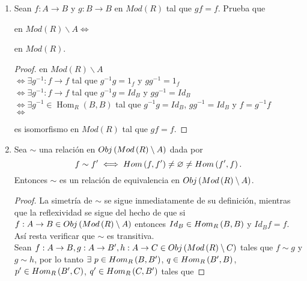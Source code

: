 \documentclass{article}
\begin{document}
\begin{enumerate}[label=\textbf{Ej \arabic*.}]
		\item Sean $f\colon A\longrightarrow B$ y $g\colon B\longrightarrow B$ en $Mod(R)$ tal que $gf=f$. Prueba que\\
		
		en $Mod(R)\backslash A$\quad $\iff$ \quad 
		en $Mod(R)$.
		
		\begin{proof}
			en $Mod(R)\backslash A$\\
			$\iff \exists g^{-1}\colon f\longrightarrow f$ tal que $g^{-1}g=1_f$ y $gg^{-1}=1_f$\\
			$\iff \exists g^{-1}\colon f\longrightarrow f$ tal que $g^{-1}g=Id_B$ y $gg^{-1}=Id_B$\\
			$\iff \exists g^{-1}\in \operatorname{Hom}_R(B,B)$ tal que $g^{-1}g=Id_B$, $gg^{-1}=Id_B$ y $f=g^{-1}f$\\
			$\iff$ 
			es isomorfismo en $Mod(R)$ tal que $gf=f$.
		\end{proof}
		\item Sea $\sim$ una relación en $Obj\left(Mod\left(R\right)\setminus A\right)$ dada por
		\begin{equation*}
			f\sim f'\iff Hom\left(f,f'\right)\neq\varnothing\neq Hom\left(f',f\right).
		\end{equation*}
		Entonces $\sim$ es un relación de equivalencia en $Obj\left(Mod\left(R\right)\setminus A\right)$.
		\begin{proof}
			La simetría de $\sim$ se sigue inmediatamente de su definición, mientras que la reflexividad se sigue del hecho de que si $f:A\to B\in Obj\left(Mod\left(R\right)\setminus A\right)$ entonces $Id_B\in Hom_{R}\left(B,B\right)$ y $Id_B f=f$. Así resta verificar que $\sim$ es transitiva.\\
			Sean $f:A\to B,g:A\to B', h:A\to C\in Obj\left(Mod\left(R\right)\setminus C\right)$ tales que $f\sim g$ y $g\sim h$, por lo tanto $\exists\ p\in\ringmodhom{R}{B}{B'}$, $q\in Hom_{R}\left(B',B\right)$, $p'\in Hom_{R}\left(B',C\right)$, $q'\in Hom_{R}\left(C,B'\right)$ tales que

\end{proof}
\end{enumerate}
\end{document}
